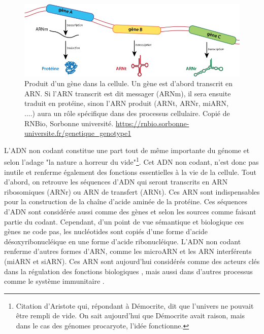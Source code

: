 \begin{figure}[htbp]
    \centering
    \includegraphics[width=\linewidth]{images/gene2prot.jpg}
    \caption[Produit d'un gène]{Produit d'un gène dans la cellule. Un gène est d'abord transcrit en ARN. Si l'ARN transcrit est dit messager (ARNm), il sera ensuite traduit en protéine, sinon l'ARN produit (ARNt, ARNr, miARN, ....) aura un rôle spécifique dans des processus cellulaire. Copié de RNBio, Sorbonne université. \url{https://rnbio.sorbonne-universite.fr/genetique_genotype1}}
    \label{fig:gene2prod}
\end{figure}

L'ADN non codant constitue une part tout de même importante du génome et selon l'adage "la nature a horreur du vide"\footnote{Citation d'Aristote qui, répondant à Démocrite, dit que l'univers ne pouvait être rempli de vide. On sait aujourd'hui que Démocrite avait raison, mais dans le cas des génomes procaryote, l'idée fonctionne.}. Cet ADN non codant, n'est donc pas inutile et renferme également des fonctions essentielles à la vie de la cellule.
Tout d'abord, on retrouve les séquences d'ADN qui seront transcrits en ARN ribosomiques (ARNr) ou ARN de transfert (ARNt). Ces ARN sont indispensables pour la construction de la chaîne d'acide aminée de la protéine. Ces séquences d'ADN sont considérée aussi comme des gènes et selon les sources comme faisant partie du codant. Cependant, d'un point de vue sémantique et biologique ces gènes ne code pas, les nucléotides sont copiés d'une forme d'acide désoxyribonucléique en une forme d'acide ribonucléique. L'ADN non codant renferme d'autres formes d'ARN, comme les microARN et les ARN interférents (miARN et siARN). Ces ARN sont aujourd'hui considérés comme des acteurs clés dans la régulation des fonctions biologiques \cite{backofen_bioinformatics_2014,watkins_regulatory_2019}, mais aussi dans d'autres processus comme le système immunitaire \cite{bobadilla_ugarte_argonaute_2023}.

